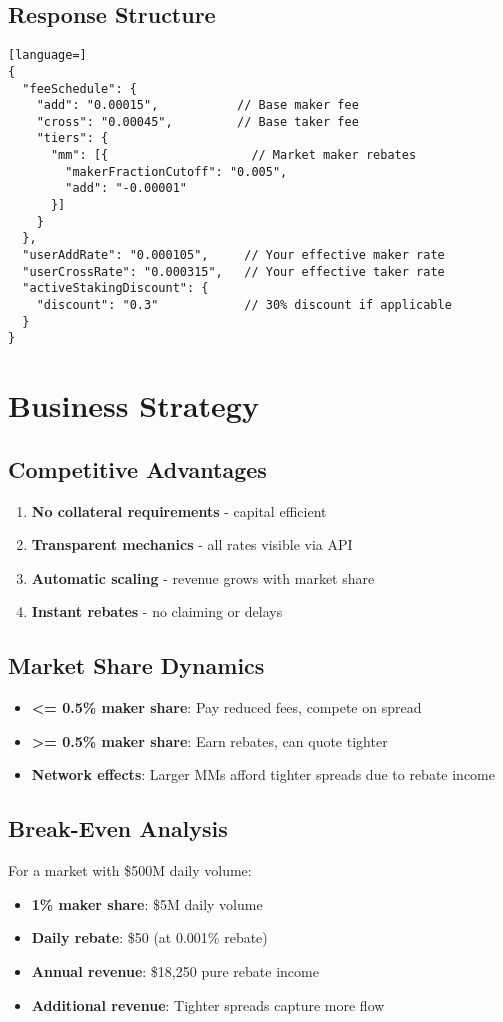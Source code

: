\documentclass[11pt,a4paper]{article}
\begin{document}
\subsection{Response Structure}
\begin{lstlisting}[language=]
{
  "feeSchedule": {
    "add": "0.00015",           // Base maker fee
    "cross": "0.00045",         // Base taker fee
    "tiers": {
      "mm": [{                    // Market maker rebates
        "makerFractionCutoff": "0.005",
        "add": "-0.00001"
      }]
    }
  },
  "userAddRate": "0.000105",     // Your effective maker rate
  "userCrossRate": "0.000315",   // Your effective taker rate
  "activeStakingDiscount": {
    "discount": "0.3"            // 30% discount if applicable
  }
}
\end{lstlisting}

\section{Business Strategy}

\subsection{Competitive Advantages}
\begin{enumerate}
    \item \textbf{No collateral requirements} - capital efficient
    \item \textbf{Transparent mechanics} - all rates visible via API
    \item \textbf{Automatic scaling} - revenue grows with market share
    \item \textbf{Instant rebates} - no claiming or delays
\end{enumerate}

\subsection{Market Share Dynamics}
\begin{itemize}
    \item \textbf{\textless= 0.5\% maker share}: Pay reduced fees, compete on spread
    \item \textbf{\textgreater= 0.5\% maker share}: Earn rebates, can quote tighter
    \item \textbf{Network effects}: Larger MMs afford tighter spreads due to rebate income
\end{itemize}

\subsection{Break-Even Analysis}
For a market with \$500M daily volume:
\begin{itemize}
    \item \textbf{1\% maker share}: \$5M daily volume
    \item \textbf{Daily rebate}: \$50 (at 0.001\% rebate)
    \item \textbf{Annual revenue}: \$18,250 pure rebate income
    \item \textbf{Additional revenue}: Tighter spreads capture more flow
\end{itemize}
\end{document}
